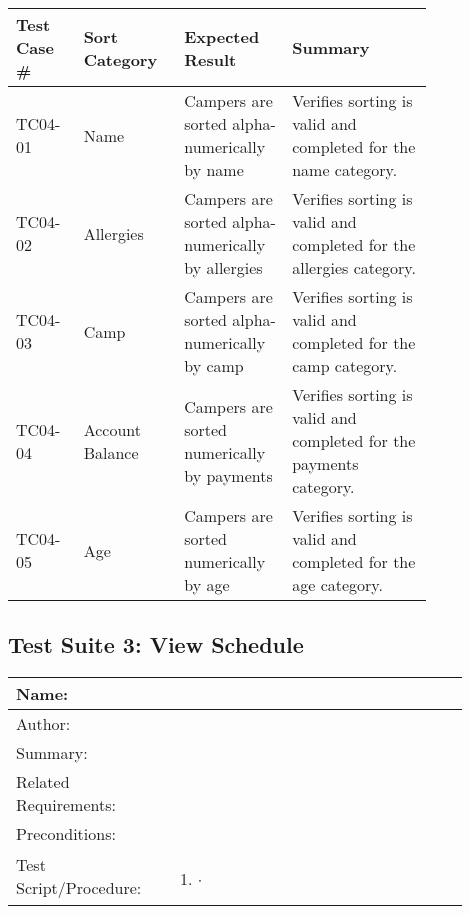 \documentclass[11pt]{article}
\begin{document}
\begin{table}[H]
\begin{center}
\begin{tabular}{p{0.13\linewidth}|p{0.20\linewidth}|p{0.20\linewidth}|p{0.30\linewidth}}
	Test Case \# & Sort Category & Expected Result & Summary\\\hline
	TC04-01 & Name & Campers are sorted alpha-numerically by name & Verifies sorting is valid and completed for the name category.\vspace*{1em}\\
	TC04-02 & Allergies & Campers are sorted alpha-numerically by allergies & Verifies sorting is valid and completed for the allergies category.\vspace*{1em}\\	
	TC04-03 & Camp & Campers are sorted alpha-numerically by camp & Verifies sorting is valid and completed for the camp category.\vspace*{1em}\\
	TC04-04 & Account Balance & Campers are sorted numerically by payments & Verifies sorting is valid and completed for the payments category.\vspace*{1em}\\
	TC04-05 & Age & Campers are sorted numerically by age & Verifies sorting is valid and completed for the age category.\vspace*{1em}\\
\end{tabular}
\label{des:}	
\end{center}
\end{table}

\subsection*{Test Suite 3: View Schedule}

\begin{table}[H]
\begin{center}
\begin{tabular}{p{0.30\linewidth}p{0.60\linewidth}}
	Name: & \\\hline
	Author: & \\\hline
	Summary: &  \\\hline
	Related Requirements:& \\\hline
	Preconditions:& \\\hline
	Test Script/Procedure: & \begin{enumerate}
	\item $\cdot$
	\end{enumerate}\\\hline
\end{tabular}
\label{des:}	
\end{center}
\end{table}
\end{document}
